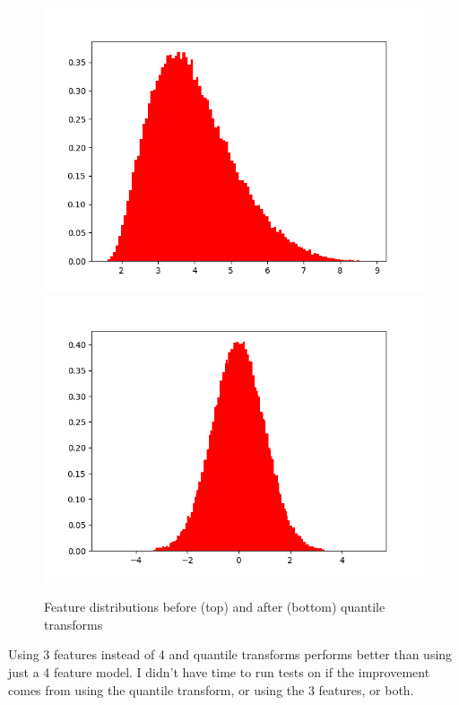 \begin{figure}[htb]
\begin{minipage}{.3\textwidth}
        \centering
        \includegraphics[width=.99\textwidth,trim={3cm 0 0 0},clip]{Chapters/Ch3-Simulations/normalizing_flows/pics/MeetingFigures/Bobby/QT/feature2_noQT.png}
        \includegraphics[width=.99\textwidth,trim={3cm 0 0 0},clip]{Chapters/Ch3-Simulations/normalizing_flows/pics/MeetingFigures/Bobby/QT/feature2.png}

    \end{minipage}%
    \caption{Feature distributions before (top) and after (bottom) quantile transforms}
    \label{fig:16features5}
\end{figure}

Using 3 features instead of 4 and quantile transforms performs better than using just a 4 feature model. I didn't have time to run tests on if the improvement comes from using the quantile transform, or using the 3 features, or both.


